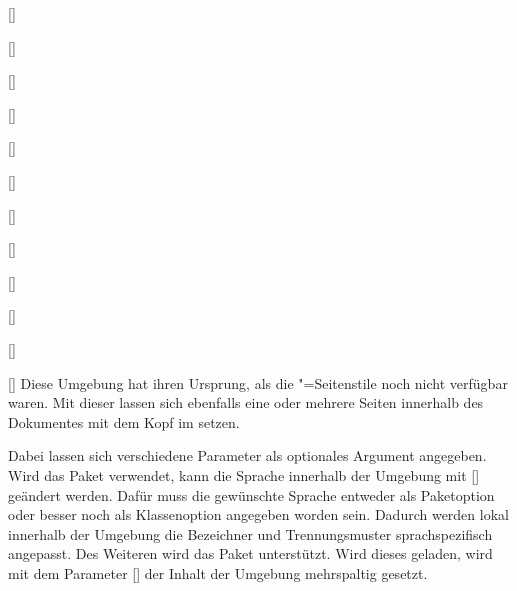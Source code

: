 \begin{Declaration}{[]}
\begin{Declaration}{[]}
\begin{Declaration}{[]}
\begin{Declaration}{[]}
\begin{Declaration}[v2.02]{[\PSet]}
\begin{Declaration}{[]}
\begin{Declaration}[v2.02]{[\PSet]}
\begin{Declaration}[v2.02]{[\PSet]}
\begin{Declaration}[v2.02]{[\PSet]}
\begin{Declaration}{[\PSet]}
\begin{Declaration}[v2.02]{[\PSet]}
\begin{Declaration}{[\PBoolean]}
\printdeclarationlist%
%
%
%
%
Diese Umgebung hat ihren Ursprung, als die "=Seitenstile 
noch nicht verfügbar waren. Mit dieser lassen sich ebenfalls eine oder mehrere 
Seiten innerhalb des Dokumentes mit dem Kopf im \CD setzen. 

Dabei lassen sich verschiedene Parameter als optionales Argument angegeben. 
Wird das Paket  verwendet, kann die Sprache innerhalb der 
Umgebung mit [] geändert 
werden. Dafür muss die gewünschte Sprache entweder als Paketoption oder besser 
noch als Klassenoption angegeben worden sein. Dadurch werden lokal innerhalb 
der Umgebung die Bezeichner und Trennungsmuster sprachspezifisch angepasst. Des 
Weiteren wird das Paket  unterstützt. Wird dieses geladen, 
wird mit dem Parameter [] 
der Inhalt der Umgebung mehrspaltig gesetzt.


\end{Declaration}
\end{Declaration}
\end{Declaration}
\end{Declaration}
\end{Declaration}
\end{Declaration}
\end{Declaration}
\end{Declaration}
\end{Declaration}
\end{Declaration}
\end{Declaration}
\end{Declaration}
